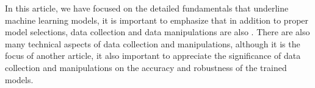
\par
In this article, we have focused on the detailed fundamentals that underline machine learning models, it is important to emphasize that in addition to proper model selections, data collection and data manipulations are also . There are also many technical aspects of data collection and manipulations, although it is the focus of another article, it also important to appreciate the significance of data collection and manipulations on the accuracy and robustness of the trained models.
\par 
